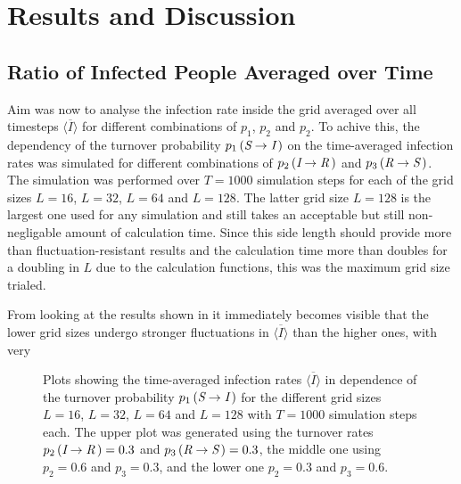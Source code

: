 \section{Results and Discussion}

\subsection{Ratio of Infected People Averaged over Time}

Aim was now to analyse the infection rate inside the grid averaged over all timesteps $\overline{\langle I\rangle}$ for different combinations of $p_1$, $p_2$ and $p_2$. To achive this, the dependency of the 
turnover probability $p_1\left(\textit{S}\rightarrow\textit{I}\,\right)$ on the time-averaged infection rates was simulated for different combinations of $p_2\left(\textit{I}\rightarrow\textit{R}\,\right)$
and $p_3\left(\textit{R}\rightarrow\textit{S}\,\right)$. The simulation was performed over $T=1000$ simulation steps for each of the grid sizes $L=16$, $L=32$, $L=64$ and $L=128$.
The latter grid size $L=128$ is the largest one used for any simulation and still takes an acceptable but still non-negligable amount of calculation time.
Since this side length should provide more than fluctuation-resistant results and the calculation time more than doubles for a doubling in $L$ due to the calculation functions, this was the maximum grid size trialed.

{From looking at the results shown in  it immediately becomes visible that the lower grid sizes undergo stronger fluctuations in $\overline{\langle I\rangle}$ than the higher ones, 
with very\parfillskip=0pt\par}

\begin{figure}[H]
    \centering
    \resizebox{\textwidth}{!}{}
    \caption{Plots showing the time-averaged infection rates $\overline{\langle I\rangle}$ in dependence of the turnover probability $p_1\left(\textit{S}\rightarrow\textit{I}\,\right)$
    for the different grid sizes $L=16$, $L=32$, $L=64$ and $L=128$ with $T=1000$ simulation steps each. The upper plot was generated using the turnover rates 
    $p_2\left(\textit{I}\rightarrow\textit{R}\,\right)=0.3$ and $p_3\left(\textit{R}\rightarrow\textit{S}\,\right)=0.3$, 
    the middle one using $p_2=0.6$ and $p_3=0.3$, and the lower one $p_2=0.3$ and $p_3=0.6$.}\label{fig:res_dis_avg_inf_over_p1}
\end{figure}

